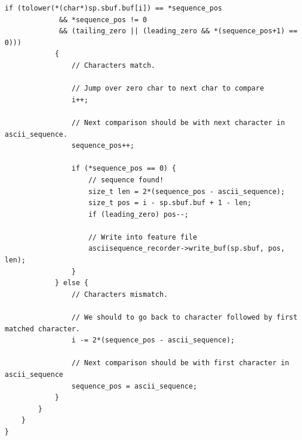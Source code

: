 \documentclass[11pt,fleqn]{article} %
\begin{document}
\begin{lstlisting}[frame=single]
    		if (tolower(*(char*)sp.sbuf.buf[i]) == *sequence_pos
    		 && *sequence_pos != 0
    		 && (tailing_zero || (leading_zero && *(sequence_pos+1) == 0)))
    		{
    			// Characters match.

				// Jump over zero char to next char to compare
				i++;

				// Next comparison should be with next character in ascii_sequence.
    			sequence_pos++;

    			if (*sequence_pos == 0) {
    				// sequence found!
    				size_t len = 2*(sequence_pos - ascii_sequence);
    				size_t pos = i - sp.sbuf.buf + 1 - len;
    				if (leading_zero) pos--;

    				// Write into feature file
    				asciisequence_recorder->write_buf(sp.sbuf, pos, len);
    			}
    		} else {
    			// Characters mismatch.

    			// We should to go back to character followed by first matched character.
    			i -= 2*(sequence_pos - ascii_sequence);

    			// Next comparison should be with first character in ascii_sequence
    			sequence_pos = ascii_sequence;
    		}
    	}
    }
}
\end{lstlisting}
\newpage
\end{document}
